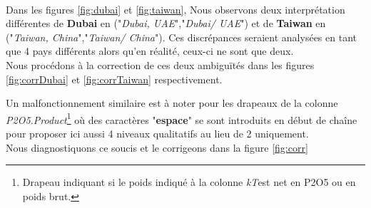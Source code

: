 	\paragraph{}
	Dans les figures \ref{fig:dubai} et \ref{fig:taiwan}, Nous observons deux interprétation différentes de \textbf{Dubai} en ("\textit{Dubai, UAE}","\textit{Dubai/ UAE}") et de \textbf{Taiwan} en ("\textit{Taiwan, China}","\textit{Taiwan/ China}"). Ces discrépances seraient analysées en tant que 4 pays différents alors qu'en réalité, ceux-ci ne sont que deux.\\Nous procédons à la correction de ces deux ambiguïtés dans les figures \ref{fig:corrDubai} et \ref{fig:corrTaiwan} respectivement.
	\par
	Un malfonctionnement similaire est à noter pour les drapeaux de la colonne \textit{P2O5.Product}\footnote{Drapeau indiquant si le poids indiqué à la colonne \textit{kT}est net en P2O5 ou en poids brut.} où des caractères "\textbf{espace}" se sont introduits en début de chaîne pour proposer ici aussi 4 niveaux qualitatifs  au lieu de 2 uniquement.\\Nous diagnostiquons ce soucis et le corrigeons dans la figure \ref{fig:corr}

